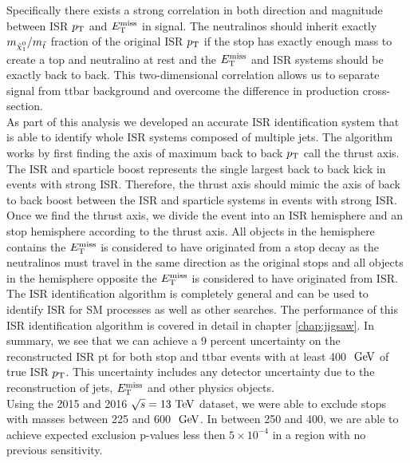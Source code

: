 \indent Specifically there exists a strong correlation in both direction and magnitude between ISR $p_{\mathrm{T}}$ and $E_{\mathrm{T}}^{\mathrm{miss}}$ in signal.  The neutralinos should inherit exactly $m_{\ninoone}/m_{\stop}$ fraction of the original ISR $p_{\mathrm{T}}$ if the stop has exactly enough mass to create a top and neutralino at rest and the $E_{\mathrm{T}}^{\mathrm{miss}}$ and ISR systems should be exactly back to back.  This two-dimensional correlation allows us to separate signal from ttbar background and overcome the difference in production cross-section. \\

\indent As part of this analysis we developed an accurate ISR identification system that is able to identify whole ISR systems composed of multiple jets.  The algorithm works by first finding the axis of maximum back to back $p_{\mathrm{T}}$ call the thrust axis.  The ISR and sparticle boost represents the single largest back to back kick in events with strong ISR.  Therefore, the thrust axis should mimic the axis of back to back boost between the ISR and sparticle systems in events with strong ISR.  Once we find the thrust axis, we divide the event into an ISR hemisphere and an stop hemisphere according to the thrust axis.  All objects in the hemisphere contains the $E_{\mathrm{T}}^{\mathrm{miss}}$ is considered to have originated from a stop decay as the neutralinos must travel in the same direction as the original stops and all objects in the hemisphere opposite the $E_{\mathrm{T}}^{\mathrm{miss}}$ is considered to have originated from ISR. \\ 

\indent The ISR identification algorithm is completely general and can be used to identify ISR for SM processes as well as other searches.  The performance of this ISR identification algorithm is covered in detail in chapter \ref{chap:jigsaw}.  In summary, we see that we can achieve a 9 percent uncertainty on the reconstructed ISR pt for both stop and ttbar events with at least 400 $\gev$ of true ISR $p_{\mathrm{T}}$. This uncertainty includes any detector uncertainty due to the reconstruction of jets, $E_{\mathrm{T}}^{\mathrm{miss}}$ and other physics objects.  \\

\indent Using the 2015 and 2016 $\sqrt{s}=13 \tev$ dataset, we were able to exclude stops with masses between 225 and 600 $\gev$.  In between 250 and 400, we are able to achieve expected exclusion p-values less then $5 \times 10^{-4}$ in a region with no previous sensitivity. \\

